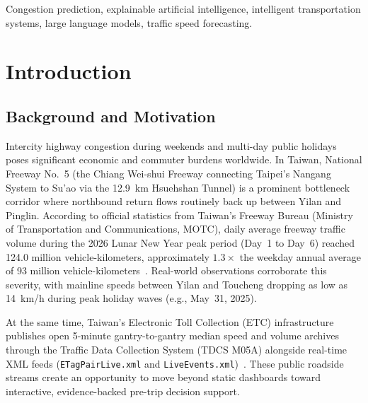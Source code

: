 \documentclass[conference]{IEEEtran}
\begin{document}
\begin{abstract}
\end{abstract}

\begin{IEEEkeywords}
Congestion prediction, explainable artificial intelligence, intelligent transportation systems, large language models, traffic speed forecasting.
\end{IEEEkeywords}

\section{Introduction}

\subsection{Background and Motivation}
Intercity highway congestion during weekends and multi-day public holidays poses significant economic and commuter burdens worldwide. In Taiwan, National Freeway No.~5 (the Chiang Wei-shui Freeway connecting Taipei's Nangang System to Su'ao via the 12.9~km Hsuehshan Tunnel) is a prominent bottleneck corridor where northbound return flows routinely back up between Yilan and Pinglin. According to official statistics from Taiwan's Freeway Bureau (Ministry of Transportation and Communications, MOTC), daily average freeway traffic volume during the 2026 Lunar New Year peak period (Day~1 to Day~6) reached 124.0 million vehicle-kilometers, approximately $1.3\times$ the weekday annual average of 93 million vehicle-kilometers~\cite{freeway2026cny}. Real-world observations corroborate this severity, with mainline speeds between Yilan and Toucheng dropping as low as 14~km/h during peak holiday waves (e.g., May~31, 2025).

At the same time, Taiwan's Electronic Toll Collection (ETC) infrastructure publishes open 5-minute gantry-to-gantry median speed and volume archives through the Traffic Data Collection System (TDCS M05A) alongside real-time XML feeds (\texttt{ETagPairLive.xml} and \texttt{LiveEvents.xml})~\cite{tdcs_m05a}. These public roadside streams create an opportunity to move beyond static dashboards toward interactive, evidence-backed pre-trip decision support.
\end{document}
